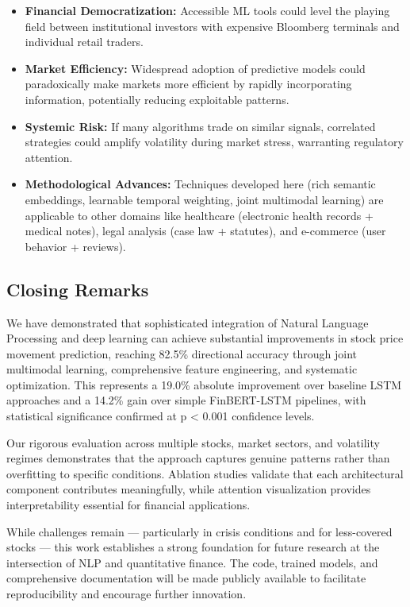 \documentclass[conference]{IEEEtran}
\begin{document}
\begin{itemize}
\item \textbf{Financial Democratization:} Accessible ML tools could level the playing field between institutional investors with expensive Bloomberg terminals and individual retail traders.

\item \textbf{Market Efficiency:} Widespread adoption of predictive models could paradoxically make markets more efficient by rapidly incorporating information, potentially reducing exploitable patterns.

\item \textbf{Systemic Risk:} If many algorithms trade on similar signals, correlated strategies could amplify volatility during market stress, warranting regulatory attention.

\item \textbf{Methodological Advances:} Techniques developed here (rich semantic embeddings, learnable temporal weighting, joint multimodal learning) are applicable to other domains like healthcare (electronic health records + medical notes), legal analysis (case law + statutes), and e-commerce (user behavior + reviews).
\end{itemize}

\subsection{Closing Remarks}

We have demonstrated that sophisticated integration of Natural Language Processing and deep learning can achieve substantial improvements in stock price movement prediction, reaching 82.5\% directional accuracy through joint multimodal learning, comprehensive feature engineering, and systematic optimization. This represents a 19.0\% absolute improvement over baseline LSTM approaches and a 14.2\% gain over simple FinBERT-LSTM pipelines, with statistical significance confirmed at p < 0.001 confidence levels.

Our rigorous evaluation across multiple stocks, market sectors, and volatility regimes demonstrates that the approach captures genuine patterns rather than overfitting to specific conditions. Ablation studies validate that each architectural component contributes meaningfully, while attention visualization provides interpretability essential for financial applications.

While challenges remain — particularly in crisis conditions and for less-covered stocks — this work establishes a strong foundation for future research at the intersection of NLP and quantitative finance. The code, trained models, and comprehensive documentation will be made publicly available to facilitate reproducibility and encourage further innovation.
\end{document}
